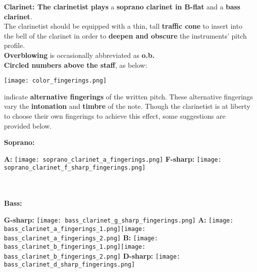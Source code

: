 \documentclass[12pt]{article}
\newcommand*\circled[1]{\tikz[baseline=(char.base)]{
            \node[shape=circle,draw,inner sep=1pt] (char) {#1};}}
\begin{document}
\begingroup
\textbf{Clarinet: \circled{1} The clarinetist plays} a \textbf{soprano clarinet in B-flat} and a \textbf{bass clarinet}. \\
\textbf{\circled{2}} The clarinetist should be equipped with a thin, tall \textbf{traffic cone} to insert into the bell of the clarinet in order to \textbf{deepen and obscure} the instruments' pitch profile. \\
\textbf{\circled{3} Overblowing} is occasionally abbreviated as \textbf{o.b.} \\
\textbf{\circled{4} Circled numbers above the staff}, as below: 
\begin{center}
\texttt{[image: color\_fingerings.png]} \\
\end{center}
indicate \textbf{alternative fingerings} of the written pitch. These alternative fingerings vary the \textbf{intonation} and \textbf{timbre} of the note. Though the clarinetist is at liberty to choose their own fingerings to achieve this effect, some suggestions are provided below. \\
\begin{center}
\textbf{Soprano:}
\end{center}
\textbf{A:} \texttt{[image: soprano\_clarinet\_a\_fingerings.png]} \hspace{6mm} \textbf{F-sharp:} \texttt{[image: soprano\_clarinet\_f\_sharp\_fingerings.png]} \\ \\ \\
\begin{center}
\textbf{Bass:}
\end{center}
\textbf{G-sharp:} \texttt{[image: bass\_clarinet\_g\_sharp\_fingerings.png]} \hspace{6mm}
\textbf{A:} \texttt{[image: bass\_clarinet\_a\_fingerings\_1.png]}\texttt{[image: bass\_clarinet\_a\_fingerings\_2.png]} \hspace{6mm}
\textbf{B:} \texttt{[image: bass\_clarinet\_b\_fingerings\_1.png]}\texttt{[image: bass\_clarinet\_b\_fingerings\_2.png]} \hspace{6mm}
\textbf{D-sharp:} \texttt{[image: bass\_clarinet\_d\_sharp\_fingerings.png]} \\ \\
\endgroup 
\end{document}
